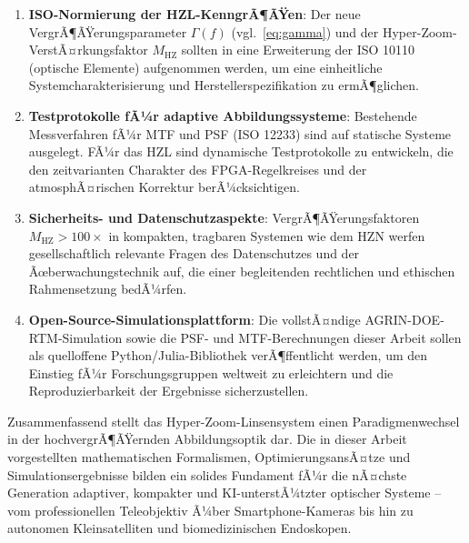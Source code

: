 ﻿\documentclass[12pt,a4paper]{article}
\theoremstyle{definition}
\newcommand{\HZ}{\mathrm{HZ}}
\begin{document}
	\begin{enumerate}[label=\arabic*.]
		\item \textbf{ISO-Normierung der HZL-KenngrÃ¶ÃŸen}: Der neue
		VergrÃ¶ÃŸerungsparameter $\Gamma(f)$ (vgl.\ \eqref{eq:gamma}) und
		der Hyper-Zoom-VerstÃ¤rkungsfaktor $M_\HZ$ sollten in eine
		Erweiterung der ISO 10110 (optische Elemente) aufgenommen werden,
		um eine einheitliche Systemcharakterisierung und Herstellerspezifikation
		zu ermÃ¶glichen.
		\item \textbf{Testprotokolle fÃ¼r adaptive Abbildungssysteme}:
		Bestehende Messverfahren fÃ¼r MTF und PSF (ISO 12233) sind auf statische
		Systeme ausgelegt.  FÃ¼r das HZL sind dynamische Testprotokolle
		zu entwickeln, die den zeitvarianten Charakter des FPGA-Regelkreises
		und der atmosphÃ¤rischen Korrektur berÃ¼cksichtigen.
		\item \textbf{Sicherheits- und Datenschutzaspekte}: VergrÃ¶ÃŸerungsfaktoren
		$M_\HZ > 100\times$ in kompakten, tragbaren Systemen wie dem HZN
		werfen gesellschaftlich relevante Fragen des Datenschutzes und
		der Ãœberwachungstechnik auf, die einer begleitenden rechtlichen und
		ethischen Rahmensetzung bedÃ¼rfen.
		\item \textbf{Open-Source-Simulationsplattform}: Die vollstÃ¤ndige
		AGRIN-DOE-RTM-Simulation sowie die PSF- und MTF-Berechnungen
		dieser Arbeit sollen als quelloffene Python/Julia-Bibliothek
		verÃ¶ffentlicht werden, um den Einstieg fÃ¼r Forschungsgruppen
		weltweit zu erleichtern und die Reproduzierbarkeit der Ergebnisse
		sicherzustellen.
	\end{enumerate}

	Zusammenfassend stellt das Hyper-Zoom-Linsensystem einen
	Paradigmenwechsel in der hochvergrÃ¶ÃŸernden Abbildungsoptik dar.
	Die in dieser Arbeit vorgestellten mathematischen Formalismen,
	OptimierungsansÃ¤tze und Simulationsergebnisse bilden ein solides
	Fundament fÃ¼r die nÃ¤chste Generation adaptiver, kompakter und
	KI-unterstÃ¼tzter optischer Systeme -- vom professionellen
	Teleobjektiv Ã¼ber Smartphone-Kameras bis hin zu autonomen
	Kleinsatelliten und biomedizinischen Endoskopen.
	
\end{document}
